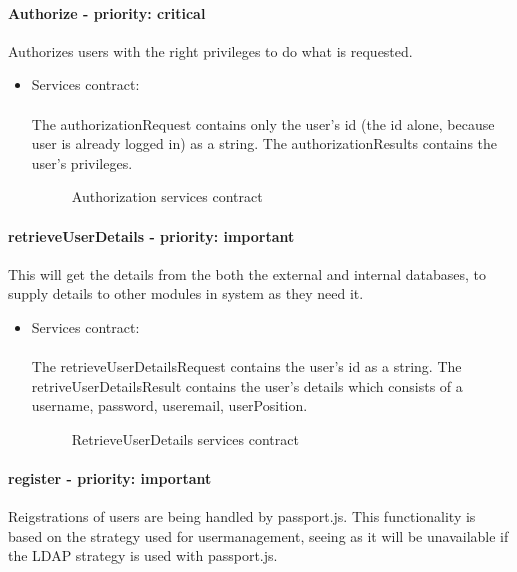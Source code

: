 \paragraph{Authorize - priority: critical}
Authorizes users with the right privileges to do what is requested.
\begin{itemize}
	\item Services contract:\\ \\
	The authorizationRequest contains only the user's id (the id alone, because user is already logged in) as a string. The authorizationResults contains the user's privileges.
	\begin{figure}[H]
    	\centering
    	\caption{Authorization services contract}
    	\label{fig:Authorization_services_contract}
   	\end{figure}
\end{itemize}

\paragraph{retrieveUserDetails - priority: important}
This will get the details from the both the external and internal databases, to supply details to other modules in system as they need it.
\begin{itemize}
	\item Services contract:\\ \\
	The retrieveUserDetailsRequest contains the user's id as a string. The retriveUserDetailsResult contains the user's details which consists of a username, password, useremail, userPosition.
	\begin{figure}[H]
    	\centering
    	\caption{RetrieveUserDetails services contract}
    	\label{fig:RetrieveUserDetails_services_contract}
   	\end{figure}
\end{itemize}

\paragraph{register - priority: important}
	Reigstrations of users are being handled by passport.js. This functionality is based on the strategy used for usermanagement, seeing as it will be unavailable if the LDAP strategy is used with passport.js.


